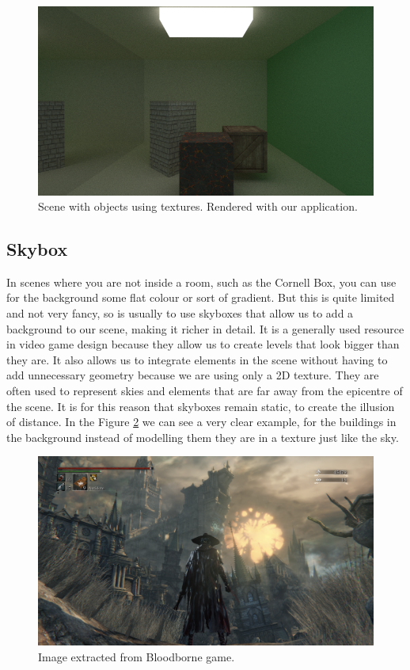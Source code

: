 \documentclass[titlepage,12pt]{report}
\begin{document}
\begin{figure}[H]
	\centering
	\includegraphics[scale=0.65]{media/cornell_textures.png}
	\caption{Scene with objects using textures. Rendered with our application.}
	\label{textures_1}
\end{figure}

\subsection{Skybox}

In scenes where you are not inside a room, such as the Cornell Box, you can use for the background some flat colour or sort of gradient. But this is quite limited and not very fancy, so is usually to use skyboxes that allow us to add a background to our scene, making it richer in detail. It is a generally used resource in video game design because they allow us to create levels that look bigger than they are. It also allows us to integrate elements in the scene without having to add unnecessary geometry because we are using only a 2D texture. They are often used to represent skies and elements that are far away from the epicentre of the scene. It is for this reason that skyboxes remain static, to create the illusion of distance. In the Figure \ref{skybox1} we can see a very clear example, for the buildings in the background instead of modelling them they are in a texture just like the sky.

\begin{figure}[H]
	\centering
	\includegraphics[scale=0.20]{media/skybox.png}
	\caption{Image extracted from Bloodborne game.}
	\label{skybox1}
\end{figure}
\end{document}
